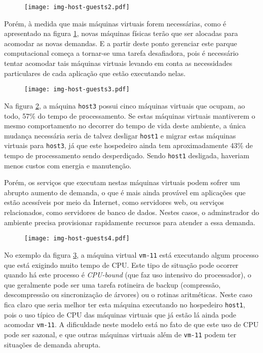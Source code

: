 \begin{figure}[htp]
\centering
\texttt{[image: img-host-guests2.pdf]}
\label{fig:hostguests2}
\end{figure}

Porém, à medida que mais máquinas virtuais forem necessárias, como é
apresentado na figura \ref{fig:hostguests2}, novas máquinas físicas terão
que ser alocadas para acomodar as novas demandas. E a partir deste ponto
gerenciar este parque computacional começa a tornar-se uma tarefa
desafiadora, pois é necessário tentar acomodar tais máquinas virtuais
levando em conta as necessidades particulares de cada aplicação que estão
executando nelas.

\begin{figure}[htp]
\centering
\texttt{[image: img-host-guests3.pdf]}
\label{fig:hostguests3}
\end{figure}

Na figura \ref{fig:hostguests3}, a máquina \texttt{host3} possui cinco máquinas
virtuais que ocupam, ao todo, 57\% do tempo de processamento. Se estas
máquinas virtuais mantiverem o mesmo comportamento no decorrer do tempo de
vida deste ambiente, a única mudança necessária seria de talvez desligar
\texttt{host1} e migrar estas máquinas virtuais para \texttt{host3}, já que
este hospedeiro ainda tem aproximadamente 43\% de tempo de processamento
sendo desperdiçado. Sendo \texttt{host1} desligada, haveriam menos custos
com energia e manutenção.

Porém, os serviços que executam nestas máquinas virtuais podem sofrer um
abrupto aumento de demanda, o que é mais ainda provável em aplicações que
estão acessíveis por meio da Internet, como servidores web, ou serviços
relacionados, como servidores de banco de dados. Nestes casos, o
adminstrador do ambiente precisa provisionar rapidamente recursos para
atender a essa demanda.

\begin{figure}[htp]
\centering
\texttt{[image: img-host-guests4.pdf]}
\label{fig:hostguests4}
\end{figure}

No exemplo da figura \ref{fig:hostguests4}, a máquina virtual
\texttt{vm-11} está executando algum processo que está exigindo muito tempo
de CPU. Este tipo de situação pode ocorrer quando há este processo é
\emph{CPU-bound} (que faz uso intensivo do processador), o que geralmente
pode ser uma tarefa rotineira de backup (compressão, descompressão ou
sincronização de árvores) ou o rotinas aritméticas. Neste caso fica claro
que seria melhor ter esta máquina executando no hospedeiro \texttt{host1},
pois o uso típico de CPU das máquinas virtuais que já estão lá ainda pode
acomodar \texttt{vm-11}. A dificuldade neste modelo está no fato de que
este uso de CPU pode ser sazonal, e que outras máquinas virtuais além de
\texttt{vm-11} podem ter situações de demanda abrupta.

